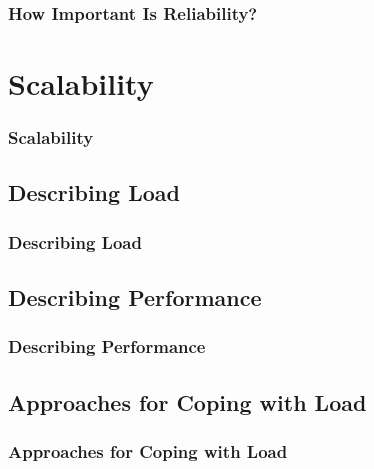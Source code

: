 \documentclass{beamer}
\begin{document}
\begin{frame}\frametitle{How Important Is Reliability?}
\end{frame}

\section{Scalability}
\begin{frame}\frametitle{Scalability}
\end{frame}

\subsection{Describing Load}
\begin{frame}\frametitle{Describing Load}
\end{frame}

\subsection{Describing Performance}
\begin{frame}\frametitle{Describing Performance}
\end{frame}

\subsection{Approaches for Coping with Load}
\begin{frame}\frametitle{Approaches for Coping with Load}
\end{frame}
\end{document}
